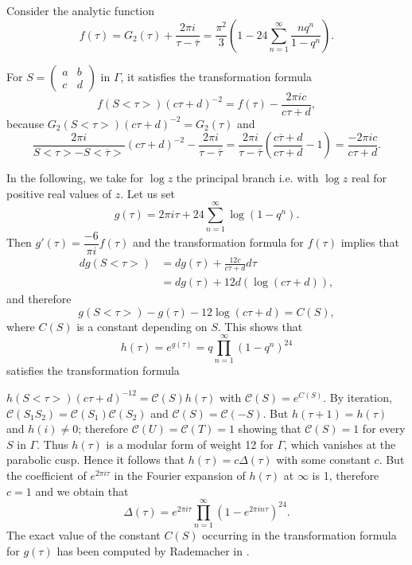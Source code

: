 Consider the analytic function 
$$
f(\tau) = G_2(\tau) + \frac{2\pi i}{\tau-\overline{\tau}}
=\frac{\pi^2}{3} \left(1-24 \sum^{\infty}_{n=1}
\frac{nq^n}{1-q^n}\right). 
$$

For $S=\left(\begin{smallmatrix} a&b\\c&d \end{smallmatrix}\right)$
in $\Gamma$, it satisfies the transformation formula
$$
f(S<\tau>)(c\tau+d)^{-2} = f(\tau) -\frac{2\pi i c}{c\tau+d},
$$
because $G_2(S<\tau>)(c\tau+d)^{-2}=G_2(\tau)$ and 
$$
\frac{2\pi i}{S<\tau>-S<\overline{\tau}>} (c\tau+d)^{-2} -\frac{2\pi i
}{\tau-\overline{\tau}} = \frac{2\pi i}{\tau-\overline{\tau}}
\left(\frac{c\overline{\tau}+d}{c\tau+d}-1\right) = \frac{-2\pi i c}{c\tau+d}.
$$

In the following, we take for $\log z$ the principal branch i.e. with
$\log z$ real for positive real values of $z$. Let us set 
$$
g(\tau) = 2\pi i \tau + 24 \sum^{\infty}_{n=1} \log(1-q^n).
$$
Then $g'(\tau)=\dfrac{-6}{\pi i}f(\tau)$ and the transformation
formula for $f(\tau)$ implies that \pageoriginale
\begin{align*}
dg(S<\tau>) & = dg(\tau) + \frac{12c}{c\tau+d}d\tau\\
& = dg(\tau) + 12 d(\log(c\tau+d)),
\end{align*}
and therefore
$$
g(S<\tau>) -g(\tau) -12 \log(c\tau+d) = C(S),
$$
where $C(S)$ is a constant depending on $S$. This shows that 
$$
h(\tau) = e^{g(\tau)} = q\prod^{\infty}_{n=1} (1-q^n)^{24}
$$
satisfies the transformation formula

$h(S<\tau>)(c\tau+d)^{-12} = \mathscr{C}(S)h(\tau)$ with
$\mathscr{C}(S)=e^{C(S)}$. By iteration, $\mathscr{C}(S_1 S_2)=
\mathscr{C}(S_1) \mathscr{C}(S_2)$ and
$\mathscr{C}(S)=\mathscr{C}(-S)$. But $h(\tau+1)=h(\tau)$ and
$h(i)\neq 0$; therefore $\mathscr{C}(U)=\mathscr{C}(T)=1$ showing that
$\mathscr{C}(S)=1$ for every $S$ in $\Gamma$. Thus $h(\tau)$ is a
modular form of weight 12 for $\Gamma$, which vanishes at the
parabolic cusp. Hence it follows that $h(\tau)=c\Delta(\tau)$ with
some constant $c$. But the coefficient of $e^{2\pi i \tau}$ in the
Fourier expansion of $h(\tau)$ at $\infty$ is 1, therefore $c=1$ and
we obtain that 
$$
\Delta(\tau) = e^{2\pi i \tau} \prod^{\infty}_{n=1} 
(1-e^{2\pi i n  \tau})^{24}. 
$$
The exact value of the constant $C(S)$ occurring in the transformation
formula for $g(\tau)$ has been computed by Rademacher in \cite{c2:key5}.

